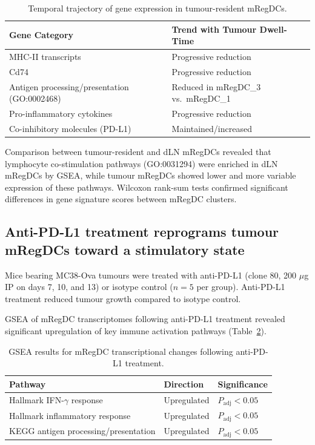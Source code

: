 \documentclass[11pt]{article}
\begin{document}
\begin{table}[ht]
\centering
\caption{Temporal trajectory of gene expression in tumour-resident mRegDCs.}
\label{tab:temporal}
\begin{tabular}{ll}
\toprule
Gene Category & Trend with Tumour Dwell-Time \\
\midrule
MHC-II transcripts & Progressive reduction \\
Cd74 & Progressive reduction \\
Antigen processing/presentation (GO:0002468) & Reduced in mRegDC\_3 vs.\ mRegDC\_1 \\
Pro-inflammatory cytokines & Progressive reduction \\
Co-inhibitory molecules (PD-L1) & Maintained/increased \\
\bottomrule
\end{tabular}
\end{table}

Comparison between tumour-resident and dLN mRegDCs revealed that lymphocyte co-stimulation pathways (GO:0031294) were enriched in dLN mRegDCs by GSEA, while tumour mRegDCs showed lower and more variable expression of these pathways. Wilcoxon rank-sum tests confirmed significant differences in gene signature scores between mRegDC clusters.

\subsection{Anti-PD-L1 treatment reprograms tumour mRegDCs toward a stimulatory state}

Mice bearing MC38-Ova tumours were treated with anti-PD-L1 (clone 80, 200 $\mu$g IP on days 7, 10, and 13) or isotype control ($n = 5$ per group). Anti-PD-L1 treatment reduced tumour growth compared to isotype control.

GSEA of mRegDC transcriptomes following anti-PD-L1 treatment revealed significant upregulation of key immune activation pathways (Table~\ref{tab:gsea}).

\begin{table}[ht]
\centering
\caption{GSEA results for mRegDC transcriptional changes following anti-PD-L1 treatment.}
\label{tab:gsea}
\begin{tabular}{lll}
\toprule
Pathway & Direction & Significance \\
\midrule
Hallmark IFN-$\gamma$ response & Upregulated & $P_{\text{adj}} < 0.05$ \\
Hallmark inflammatory response & Upregulated & $P_{\text{adj}} < 0.05$ \\
KEGG antigen processing/presentation & Upregulated & $P_{\text{adj}} < 0.05$ \\
\bottomrule
\end{tabular}
\end{table}
\end{document}
